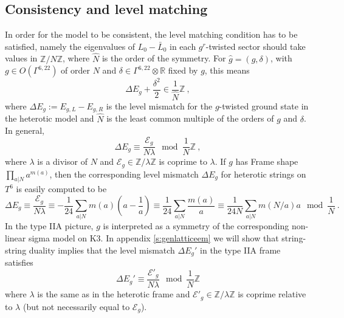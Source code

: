 \documentclass[a4paper,11pt]{article}
\newcommand{\RR}{\mathbb{R}}
\newcommand{\ZZ}{\mathbb{Z}}
\newcommand{\E}{\mathcal{E}}
\numberwithin{equation}{section}
\def\be{\begin{equation}}
\def\ee{\end{equation}}
\begin{document}
\subsection{Consistency and level matching}\label{s:levelmatch}

In order for the model to be consistent, the level matching condition has to be satisfied, namely the eigenvalues of $L_0-\bar L_0$ in each $g^r$-twisted sector should take values in $\ZZ/\hat{N}\ZZ$, where $\hat N$ is the order of the symmetry. For $\hat g=(g,\delta)$, with $g\in O(\Gamma^{6,22})$ of order $N $ and $\delta\in \Gamma^{6,22}\otimes \RR$ fixed by $g$, this means 
\be\label{levelmatch} \Delta E_g+\frac{\delta^2}{2}\in \frac{1}{\hat N}\ZZ\ ,
\ee where  
$ \Delta E_g:= E_{g,L}-E_{g,R}$  is the level mismatch for the $g$-twisted ground state in the heterotic model and $\hat N$ is the least common multiple of the orders of $g$ and $\delta$. In general,
\be\label{Elev2} \Delta E_g\equiv \frac{\E_g}{N\lambda}\mod \frac{1}{N}\ZZ\ ,\ee where $\lambda$ is a divisor of $N$ and $\E_g\in \ZZ/\lambda\ZZ$ is coprime to $\lambda$. If $g$ has Frame shape $\prod_{a|N} a^{m(a)}$, then the corresponding level mismatch $\Delta E_g$ for heterotic strings on $T^6$ is easily computed to be
\be\label{Elevel} \Delta E_g\equiv \frac{\E_g}{N\lambda}\equiv  -\frac{1}{24}\sum_{a|N}m(a)(a-\frac{1}{a})\equiv \frac{1}{24}\sum_{a|N}\frac{m(a)}{a}\equiv \frac{1}{24N}\sum_{a|N} m(N/a)a\mod \frac{1}{N}\ .
\ee
In the type IIA picture, $g$ is interpreted as a symmetry of the corresponding non-linear sigma model on K3. In appendix \ref{s:genlatticeem} we will show that  string-string duality implies that the level mismatch $\Delta E_g'$ in the type IIA frame satisfies
\be \Delta E_g'\equiv  \frac{\E'_g}{N\lambda} \mod \frac{1}{N}\ZZ
\ee where $\lambda$ is the same as in the heterotic frame and $\E'_g\in \ZZ/\lambda\ZZ$ is coprime relative to $\lambda$ (but not necessarily equal to $\E_g$).


 
 
\bigskip
\end{document}
